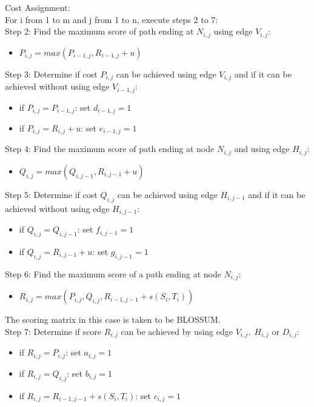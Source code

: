 \documentclass{article}
\begin{document}
	Cost Assignment:\\
	For i from 1 to m and j from 1 to n, execute steps 2 to 7:\\
	Step 2: Find the maximum score of path ending at $ N_{i, j} $ using edge $ V_{i, j} $:
	\begin{itemize}
		\item $ P_{i, j} = max(P_{i-1, j}, R_{i-1, j} + u) $
	\end{itemize}
	Step 3: Determine if cost $ P_{i, j} $ can be achieved using edge $ V_{i, j} $ and if it can be achieved without using edge $ V_{i-1, j} $:
	\begin{itemize}
		\item if $ P_{i, j} = P_{i-1, j} $: set $ d_{i-1, j} = 1 $
		\item if $ P_{i, j} = R_{i, j} + u $: set $ e_{i-1, j} = 1 $
	\end{itemize}
	Step 4: Find the maximum score of path ending at node $ N_{i, j} $ and using edge $ H_{i, j} $:
	\begin{itemize}
		\item $ Q_{i, j} = max(Q_{i, j-1}, R_{i, j-1} + u) $
	\end{itemize}
	Step 5: Determine if cost $ Q_{i, j} $ can be achieved using edge $ H_{i, j-1} $ and if it can be achieved without using edge $ H_{i, j-1} $:
	\begin{itemize}
		\item if $ Q_{i, j} = Q_{i, j-1} $: set $ f_{i, j-1} = 1 $
		\item if $ Q_{i, j} = R_{i, j-1} + u $: set $ g_{i, j-1} = 1 $
	\end{itemize}
	Step 6: Find the maximum score of a path ending at node $ N_{i, j} $:
	\begin{itemize}
		\item $ R_{i, j} = max(P_{i, j}, Q_{i, j}, R_{i-1, j-1} + s(S_i, T_i)) $
	\end{itemize}
	The scoring matrix in this case is taken to be BLOSSUM.\\
	Step 7: Determine if score $ R_{i, j} $ can be achieved by using edge $ V_{i, j}, \; H_{i, j}$ or $ D_{i, j} $:
	\begin{itemize}
		\item if $ R_{i, j} = P_{i, j} $: set $ a_{i, j} = 1 $
		\item if $ R_{i, j} = Q_{i, j} $: set $ b_{i, j} = 1 $
		\item if $ R_{i, j} = R_{i-1, j-1} + s(S_i, T_i) $: set $ c_{i, j} = 1 $
	\end{itemize}
	
\end{document}
